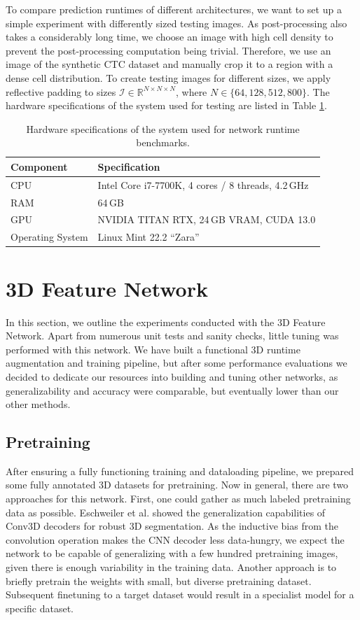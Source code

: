 To compare prediction runtimes of different architectures, we want to set up a simple experiment with differently sized testing images. As post-processing also takes a considerably long time, we choose an image with high cell density to prevent the post-processing computation being trivial. Therefore, we use an image of the synthetic CTC dataset and manually crop it to a region with a dense cell distribution. To create testing images for different sizes, we apply reflective padding to sizes $\mathcal{I} \in \mathbb{R}^{N \times N \times N}$, where $N \in \{64, 128, 512, 800\}$. The hardware specifications of the system used for testing are listed in Table \ref{tab:4.6}.
\begin{table}[h]
\centering
\caption{Hardware specifications of the system used for network runtime benchmarks.}
\label{tab:4.6}
\begin{tabular}{ll}
\hline
\textbf{Component} & \textbf{Specification} \\
\hline
CPU & Intel Core i7-7700K, 4 cores / 8 threads, 4.2\,GHz \\
RAM & 64\,GB \\
GPU & NVIDIA TITAN RTX, 24\,GB VRAM, CUDA 13.0 \\
Operating System & Linux Mint 22.2 ``Zara'' \\
\hline
\end{tabular}
\end{table}

\section{3D Feature Network}

In this section, we outline the experiments conducted with the 3D Feature Network. Apart from numerous unit tests and sanity checks, little tuning was performed with this network. We have built a functional 3D runtime augmentation and training pipeline, but after some performance evaluations we decided to dedicate our resources into building and tuning other networks, as generalizability and accuracy were comparable, but eventually lower than our other methods. 

\subsection{Pretraining}

After ensuring a fully functioning training and dataloading pipeline, we prepared some fully annotated 3D datasets for pretraining. Now in general, there are two approaches for this network. First, one could gather as much labeled pretraining data as possible. Eschweiler et al. \cite{eschweiler2022robust3dcellsegmentation} showed the generalization capabilities of Conv3D decoders for robust 3D segmentation. As the inductive bias from the convolution operation makes the CNN decoder less data-hungry, we expect the network to be capable of generalizing with a few hundred pretraining images, given there is enough variability in the training data. 
Another approach is to briefly pretrain the weights with small, but diverse pretraining dataset. Subsequent finetuning to a target dataset would result in a specialist model for a specific dataset. 

